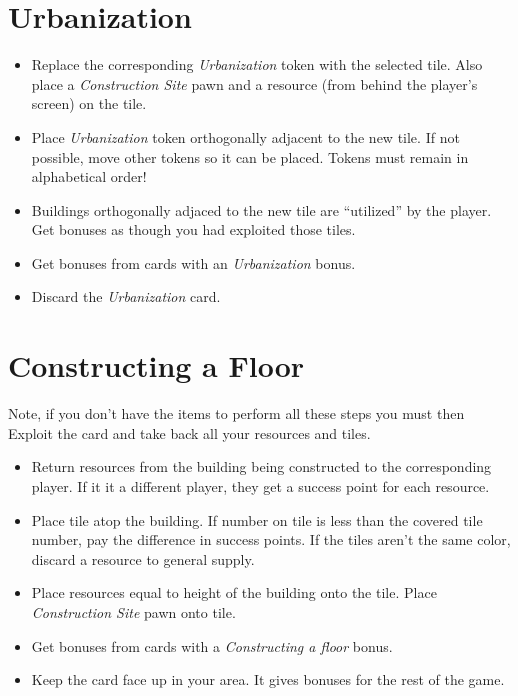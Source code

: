 \documentclass[12pt]{article}
\newenvironment{itemizeCustom}
{\begin{itemize}
  \setlength{\itemsep}{1pt}
  \setlength{\parskip}{0pt}
  \setlength{\parsep}{0pt}}
{\end{itemize}}
\begin{document}
\begin{multicols*}{2}
\section*{Urbanization}
\begin{itemizeCustom}
	\item Replace the corresponding \emph{Urbanization} token with the selected tile. Also place a \emph{Construction Site} pawn and a resource (from behind the player's screen) on the tile.
	\item Place \emph{Urbanization} token orthogonally adjacent to the new tile. If not possible, move other tokens so it can be placed. Tokens must remain in alphabetical order!
	\item Buildings orthogonally adjaced to the new tile are ``utilized'' by the player. Get bonuses as though you had exploited those tiles.
	\item Get bonuses from cards with an \emph{Urbanization} bonus.
	\item Discard the \emph{Urbanization} card.
\end{itemizeCustom}

\section*{Constructing a Floor}
Note, if you don't have the items to perform all these steps you must then Exploit the card and take back all your resources and tiles.
\begin{itemizeCustom}
	\item Return resources from the building being constructed to the corresponding player. If it it a different player, they get a success point for each resource.
	\item Place tile atop the building. If number on tile is less than the covered tile number, pay the difference in success points. If the tiles aren't the same color, discard a resource to general supply.
	\item Place resources equal to height of the building onto the tile. Place \emph{Construction Site} pawn onto tile.
	\item Get bonuses from cards with a \emph{Constructing a floor} bonus.
	\item Keep the card face up in your area. It gives bonuses for the rest of the game.
\end{itemizeCustom}


\end{multicols*}
\end{document}
